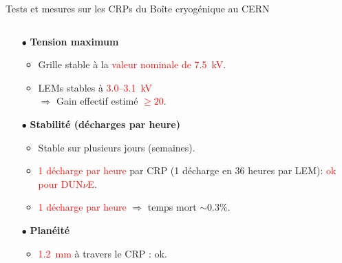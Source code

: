 \begin{frame}{Tests et mesures sur les CRPs du \SSS{}}{Boîte cryogénique au CERN}
\begin{columns}
\begin{column}{0.6\textwidth}
\begin{scriptsize}
	    			\begin{itemize}
	    				\item[$\bullet$] \textbf{Tension maximum}
	    				\begin{itemize}
	    					\item Grille stable à la \textcolor{red}{valeur nominale de \SI{7.5}{\kilo\volt}}.
	    					\item LEMs stables à \textcolor{red}{3.0--\SI{3.1}{\kilo\volt}}\\
				    					$\Rightarrow$ Gain effectif estimé \textcolor{red}{$\geq 20$}.
	    				\end{itemize}
	    				\item[$\bullet$] \textbf{Stabilité (décharges par heure)}
	    				\begin{itemize}
	    					\item Stable sur plusieurs jours (semaines).
	    					\item \textcolor{red}{1 décharge par heure} par CRP (1 décharge en 36 heures par LEM): \textcolor{red}{ok pour DUN$\nu$E}.
	    					\item \textcolor{red}{1 décharge par heure} $\Rightarrow$ temps mort $\sim$0.3\%.
	    				\end{itemize}
	    				\item[$\bullet$] \textbf{Planéité}
	    				\begin{itemize}
	    					\item \textcolor{red}{\SI{1.2}{\milli\meter}} à travers le CRP : ok.
	    				\end{itemize}
	    			\end{itemize}
	    		\end{scriptsize}
    		\end{column}
    	\end{columns}
	    \end{frame}

